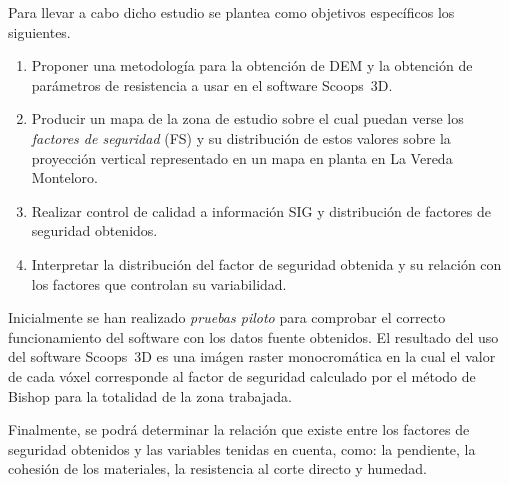 Para llevar a cabo dicho estudio se plantea como objetivos espec\'ificos  los siguientes.

\begin{enumerate}
    \item Proponer una metodolog\'ia para la obtenci\'on de DEM y la obtenci\'on de par\'ametros de resistencia a usar en el software Scoops~3D.
    \item Producir un mapa de la zona de estudio sobre el cual puedan verse los \emph{factores de seguridad} (FS) y su distribuci\'on de estos valores sobre la proyecci\'on vertical representado en un mapa en planta en La Vereda Monteloro.
    \item Realizar control de calidad a informaci\'on SIG y distribuci\'on de factores de seguridad obtenidos.
    \item Interpretar la distribuci\'on del factor de seguridad obtenida y su relaci\'on con los factores que controlan su variabilidad.
\end{enumerate} 

Inicialmente se han realizado \emph{pruebas piloto} para comprobar el correcto funcionamiento del software con los datos fuente obtenidos.
El resultado del uso del software Scoops~3D es una im\'agen raster monocrom\'atica en la cual el valor de cada v\'oxel corresponde al factor de seguridad calculado por el m\'etodo de Bishop para la totalidad de la zona trabajada. 

Finalmente, se podr\'a determinar la  relaci\'on que existe entre los factores de seguridad obtenidos y las variables tenidas en cuenta, como: la pendiente, la cohesi\'on de los materiales, la resistencia al corte directo y humedad.
\\

